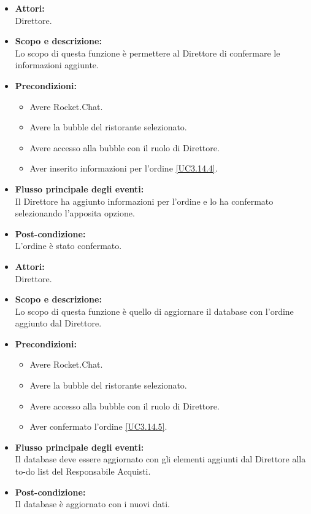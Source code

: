 
\begin{itemize}
	\item \textbf{Attori:}
	\\Direttore.
	\item \textbf{Scopo e descrizione:} 
	\\Lo scopo di questa funzione è permettere al Direttore di confermare le informazioni aggiunte.
	\item \textbf{Precondizioni:}
	\begin{itemize}
		\item Avere Rocket.Chat.
		\item Avere la bubble del ristorante selezionato.
		\item Avere accesso alla bubble con il ruolo di Direttore.
		\item Aver inserito informazioni per l'ordine \ref{UC3.14.4}.
	\end{itemize}
	\item \textbf{Flusso principale degli eventi:}
	\\Il Direttore ha aggiunto informazioni per l'ordine e lo ha confermato selezionando l'apposita opzione.
	\item \textbf{Post-condizione:}
	\\L'ordine è stato confermato.
\end{itemize}


\begin{itemize}
	\item \textbf{Attori:}
	\\Direttore.
	\item \textbf{Scopo e descrizione:} 
	\\Lo scopo di questa funzione è quello di aggiornare il database con l'ordine aggiunto dal Direttore.
	\item \textbf{Precondizioni:}
	\begin{itemize}
		\item Avere Rocket.Chat.
		\item Avere la bubble del ristorante selezionato.
		\item Avere accesso alla bubble con il ruolo di Direttore.
		\item Aver confermato l'ordine \ref{UC3.14.5}.
	\end{itemize}
	\item \textbf{Flusso principale degli eventi:}
	\\Il database deve essere aggiornato con gli elementi aggiunti dal Direttore alla to-do list del Responsabile Acquisti.
	\item \textbf{Post-condizione:}
	\\Il database è aggiornato con i nuovi dati.
\end{itemize}

